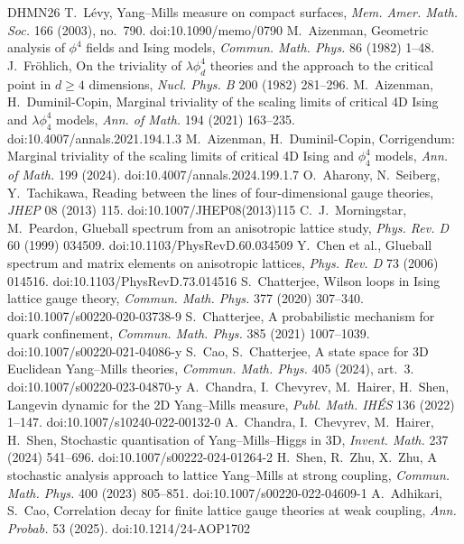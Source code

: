 \documentclass[11pt,a4paper]{article}
\begin{document}
\begin{thebibliography}{DHMN26}
 T.~L\'evy, Yang--Mills measure on compact surfaces, \emph{Mem. Amer. Math. Soc.} 166 (2003), no.~790. doi:10.1090/memo/0790
 M.~Aizenman, Geometric analysis of $\phi^4$ fields and Ising models, \emph{Commun. Math. Phys.} 86 (1982) 1--48.
 J.~Fr\"ohlich, On the triviality of $\lambda\phi^4_d$ theories and the approach to the critical point in $d\ge4$ dimensions, \emph{Nucl. Phys. B} 200 (1982) 281--296.
 M.~Aizenman, H.~Duminil-Copin, Marginal triviality of the scaling limits of critical 4D Ising and $\lambda\phi^4_4$ models, \emph{Ann. of Math.} 194 (2021) 163--235. doi:10.4007/annals.2021.194.1.3
 M.~Aizenman, H.~Duminil-Copin, Corrigendum: Marginal triviality of the scaling limits of critical 4D Ising and $\phi^4_4$ models, \emph{Ann. of Math.} 199 (2024). doi:10.4007/annals.2024.199.1.7
 O.~Aharony, N.~Seiberg, Y.~Tachikawa, Reading between the lines of four-dimensional gauge theories, \emph{JHEP} 08 (2013) 115. doi:10.1007/JHEP08(2013)115
 C.~J.~Morningstar, M.~Peardon, Glueball spectrum from an anisotropic lattice study, \emph{Phys. Rev. D} 60 (1999) 034509. doi:10.1103/PhysRevD.60.034509
 Y.~Chen et al., Glueball spectrum and matrix elements on anisotropic lattices, \emph{Phys. Rev. D} 73 (2006) 014516. doi:10.1103/PhysRevD.73.014516
 S.~Chatterjee, Wilson loops in Ising lattice gauge theory, \emph{Commun. Math. Phys.} 377 (2020) 307--340. doi:10.1007/s00220-020-03738-9
 S.~Chatterjee, A probabilistic mechanism for quark confinement, \emph{Commun. Math. Phys.} 385 (2021) 1007--1039. doi:10.1007/s00220-021-04086-y
 S.~Cao, S.~Chatterjee, A state space for 3D Euclidean Yang--Mills theories, \emph{Commun. Math. Phys.} 405 (2024), art.~3. doi:10.1007/s00220-023-04870-y
 A.~Chandra, I.~Chevyrev, M.~Hairer, H.~Shen, Langevin dynamic for the 2D Yang--Mills measure, \emph{Publ. Math. IHÉS} 136 (2022) 1--147. doi:10.1007/s10240-022-00132-0
 A.~Chandra, I.~Chevyrev, M.~Hairer, H.~Shen, Stochastic quantisation of Yang--Mills--Higgs in 3D, \emph{Invent. Math.} 237 (2024) 541--696. doi:10.1007/s00222-024-01264-2
 H.~Shen, R.~Zhu, X.~Zhu, A stochastic analysis approach to lattice Yang--Mills at strong coupling, \emph{Commun. Math. Phys.} 400 (2023) 805--851. doi:10.1007/s00220-022-04609-1
 A.~Adhikari, S.~Cao, Correlation decay for finite lattice gauge theories at weak coupling, \emph{Ann. Probab.} 53 (2025). doi:10.1214/24-AOP1702

\end{thebibliography}
\end{document}
